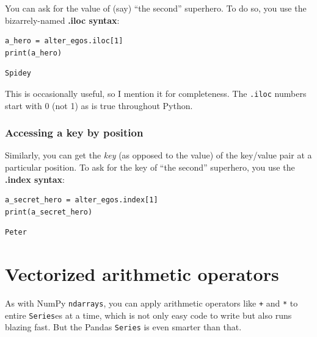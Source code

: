 
You can ask for the value of (say) ``the second'' superhero. To do so, you use
the bizarrely-named \textbf{.iloc syntax}:

\begin{Verbatim}[fontsize=\small,samepage=true,frame=single,framesep=3mm]
a_hero = alter_egos.iloc[1]
print(a_hero)
\end{Verbatim}
\vspace{-.3in}

\begin{Verbatim}[fontsize=\small,samepage=true,frame=leftline,framesep=5mm,framerule=1mm]
Spidey
\end{Verbatim}

This is occasionally useful, so I mention it for completeness. The
\texttt{.iloc} numbers start with 0 (not 1) as is true throughout Python.

\subsubsection{Accessing a key by position}

\label{dotIndex}

Similarly, you can get the \textit{key} (as opposed to the value) of the
key/value pair at a particular position. To ask for the key of ``the second''
superhero, you use the \textbf{.index syntax}:

\begin{Verbatim}[fontsize=\small,samepage=true,frame=single,framesep=3mm]
a_secret_hero = alter_egos.index[1]
print(a_secret_hero)
\end{Verbatim}
\vspace{-.3in}

\begin{Verbatim}[fontsize=\small,samepage=true,frame=leftline,framesep=5mm,framerule=1mm]
Peter
\end{Verbatim}


\section{Vectorized arithmetic operators}

As with NumPy \texttt{ndarrays}, you can apply arithmetic operators like
\texttt{+} and \texttt{*} to entire \texttt{Series}es at a time, which is not
only easy code to write but also runs blazing fast. But the Pandas
\texttt{Series} is even smarter than that.

